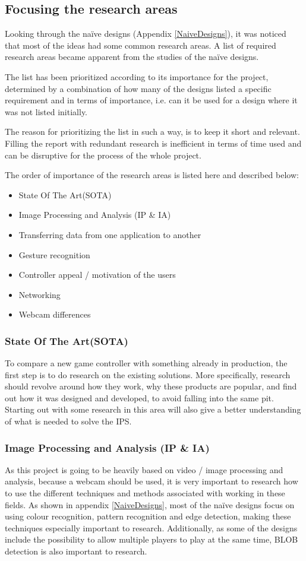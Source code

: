 \subsection{Focusing the research areas}
Looking through the naïve designs (Appendix \ref{NaiveDesigns}), it was noticed that most of the ideas had some common research areas. A list of required research areas became apparent from the studies of the naïve designs.

The list has been prioritized according to its importance for the project, determined by a combination of how many of the designs listed a specific requirement and in terms of importance, i.e. can it be used for a design where it was not listed initially.

The reason for prioritizing the list in such a way, is to keep it short and relevant. Filling the report with redundant research is inefficient in terms of time used and can be disruptive for the process of the whole project.
\bigskip

The order of importance of the research areas is listed here and described below:
\begin{itemize}
\item State Of The Art(SOTA)
\item Image Processing and Analysis (IP \& IA)
\item Transferring data from one application to another
\item Gesture recognition
\item Controller appeal / motivation of the users
\item Networking
\item Webcam differences
\end{itemize}

\subsubsection{State Of The Art(SOTA)}
To compare a new game controller with something already in production, the first step is to do research on the existing solutions. More specifically, research should revolve around how they work, why these products are popular, and find out how it was designed and developed, to avoid falling into the same pit. Starting out with some research in this area will also give a better understanding of what is needed to solve the IPS.

\subsubsection{Image Processing and Analysis (IP \& IA)}
As this project is going to be heavily based on video / image processing and analysis, because a webcam should be used, it is very important to research how to use the different techniques and methods associated with working in these fields. As shown in appendix \ref{NaiveDesigns}, most of the naïve designs focus on using colour recognition, pattern recognition and edge detection, making these techniques especially important to research. Additionally, as some of the designs include the possibility to allow multiple players to play at the same time, BLOB detection is also important to research.

